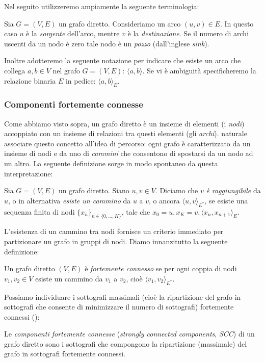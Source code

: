 Nel seguito utilizzeremo ampiamente la seguente terminologia:
\begin{definition}
    Sia $G = (V,E)$ un grafo diretto. Consideriamo un arco $(u,v) \in E$. In questo caso $u$ è la \emph{sorgente} dell'arco, mentre $v$ è la \emph{destinazione}. Se il numero di archi uscenti da un nodo è zero tale nodo  è un \emph{pozzo} (dall'inglese \emph{sink}).
\end{definition}

Inoltre adotteremo la seguente notazione per indicare che esiste un arco che collega $a,b \in V$ nel grafo $G = (V,E)$: $\langle a, b \rangle$. Se vi è ambiguità specificheremo la relazione binaria $E$ in pedice: $\langle a, b \rangle_E$.

\subsubsection{Componenti fortemente connesse}
Come abbiamo visto sopra, un grafo diretto è un insieme di elementi (i \emph{nodi}) accoppiato con un insieme di relazioni tra questi elementi (gli \emph{archi}). \accente naturale associare questo concetto all'idea di percorso: ogni grafo è caratterizzato da un insieme di nodi e da uno di \emph{cammini} che consentono di spostarsi da un nodo ad un altro. La seguente definizione sorge in modo spontaneo da questa interpretazione:
\begin{definition}
    Sia $G = (V, E)$ un grafo diretto. Siano $u,v \in V$. Diciamo che $v$ \emph{è raggiungibile} da $u$, o in alternativa \emph{esiste un cammino} da $u$ a $v$, o ancora $\langle u, v \rangle_{E^*}$, se esiste una sequenza finita di nodi $\displaystyle \{x_n\}_{n \in \{0,\dots,K\}}$, tale che $x_0 = u, x_K = v, \langle x_n, x_{n+1} \rangle_E$.
\end{definition}

L'esistenza di un cammino tra nodi fornisce un criterio immediato per partizionare un grafo in gruppi di nodi. Diamo innanzitutto la seguente definizione:
\begin{definition}
    Un grafo diretto $(V,E)$ è \emph{fortemente connesso} se per ogni coppia di nodi $v_1, v_2 \in V$ esiste un cammino da $v_1$ a $v_2$, cioè $\langle v_1, v_2 \rangle_{E^*}$.
\end{definition}

Possiamo individuare i sottografi massimali (cioè la ripartizione del grafo in sottografi che consente di minimizzare il numero di sottografi) fortemente connessi (\hspace*{-0.1cm}\cite[Appendice B]{clrs}):
\begin{definition}
    Le \emph{componenti fortemente connesse} (\emph{strongly connected components}, \emph{SCC}) di un grafo diretto sono i sottografi che compongono la ripartizione (massimale) del grafo in sottografi fortemente connessi.
\end{definition}


